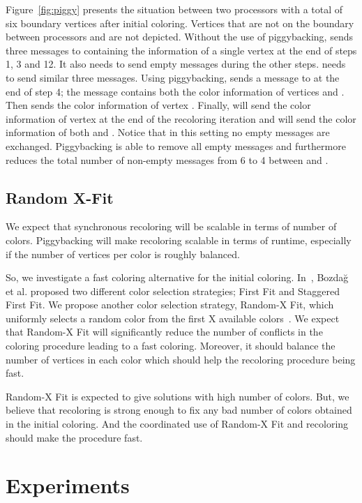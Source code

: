 \documentclass{article}
\begin{document}
Figure~\ref{fig:piggy} presents the situation between two processors
with a total of six boundary vertices after initial coloring. Vertices that are
not on the boundary between processors  and  are not
depicted. Without the use of piggybacking,  sends three messages
to  containing the information of a single vertex at the end of
steps 1, 3 and 12. It also needs to send empty messages during the
other steps.  needs to send similar three messages. Using
piggybacking,  sends a message to  at the end of step 4; the
message contains both the color information of vertices  and
. Then  sends the color information of vertex
. Finally,  will send the color information of vertex 
at the end of the recoloring iteration and  will send the color
information of both  and . Notice that in this setting no
empty messages are exchanged. Piggybacking is able to remove all empty
messages and furthermore reduces the total number of non-empty
messages from 6 to 4 between  and .

\subsection{Random X-Fit}

We expect that synchronous recoloring will be scalable in terms of
number of colors. Piggybacking will make recoloring scalable in terms
of runtime, especially if the number of vertices per color is
roughly balanced.

So, we investigate a fast coloring alternative for the initial
coloring. In~\cite{BGMBC-jpdc}, Bozda\u{g} et al. proposed two
different color selection strategies; First Fit and Staggered First
Fit. We propose another color selection strategy, Random-X Fit, which
uniformly selects a random color from the first X available
colors~\cite{Gebremedhin02paralleldistance-k}. We expect that Random-X
Fit will significantly reduce the number of conflicts in the coloring
procedure leading to a fast coloring. Moreover, it should balance the
number of vertices in each color which should help the recoloring
procedure being fast.

Random-X Fit is expected to give solutions with high number of colors. But, we
believe that recoloring is strong enough to fix any bad number of
colors obtained in the initial coloring. And the coordinated use of
Random-X Fit and recoloring should make the procedure fast.

\section{Experiments}
\label{sec:expe}
\end{document}
